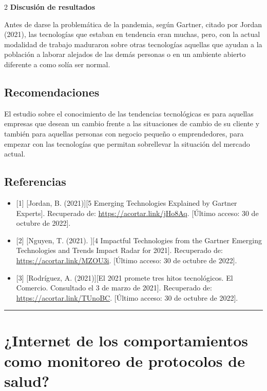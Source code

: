 \documentclass[12pt,spanish,Letterpaper,openany]{book}
\newcommand{\HRule}{\begin{center}\rule{0.5\linewidth}{0.2mm}\end{center}}
\begin{document}
\begin {multicols}{2}
\textbf{Discusión de resultados}

Antes de darse la problemática de la pandemia, según Gartner, citado por Jordan (2021), las tecnologías que estaban en tendencia eran muchas, pero, con la actual modalidad de trabajo maduraron sobre otras tecnologías aquellas que ayudan a la población a laborar alejados de las demás personas o en un ambiente abierto diferente a como solía ser normal.

\hypertarget{recomendaciones}{%
\section{Recomendaciones}\label{recomendaciones}}

El estudio sobre el conocimiento de las tendencias tecnológicas es para aquellas empresas que desean un cambio frente a las situaciones de cambio de su cliente y también para aquellas personas con negocio pequeño o emprendedores, para empezar con las tecnologías que permitan sobrellevar la situación del mercado actual.

\hypertarget{referencias-4}{%
\section{Referencias}\label{referencias-4}}

\begin{itemize}
\item
  {[}1{]} {[}Jordan, B. (2021){]}{[}5 Emerging Technologies Explained by Gartner Experts{]}. Recuperado de: \url{https://acortar.link/jHo8Aq}. {[}Último acceso: 30 de octubre de 2022{]}.
\item
  {[}2{]} {[}Nguyen, T. (2021). {]}{[}4 Impactful Technologies from the Gartner Emerging Technologies and Trends Impact Radar for 2021{]}. Recuperado de: \url{https://acortar.link/MZOU3i}. {[}Último acceso: 30 de octubre de 2022{]}.
\item
  {[}3{]} {[}Rodríguez, A. (2021){]}{[}El 2021 promete tres hitos tecnológicos. El Comercio. Consultado el 3 de marzo de 2021{]}. Recuperado de: \url{https://acortar.link/TUnoBC}. {[}Último acceso: 30 de octubre de 2022{]}.
\end{itemize}

\end {multicols}
\medskip
\HRule
\medskip

\hypertarget{cJuarez}{%
\chapter{¿Internet de los comportamientos como monitoreo de protocolos de salud?}\label{cJuarez}}
\end{document}
